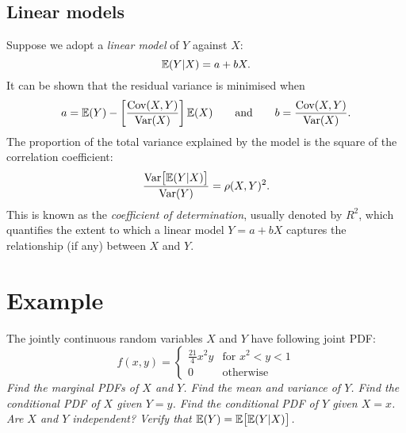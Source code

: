 \subsection{Linear models} 
Suppose we adopt a \emph{linear model} of $Y$ against $X$:
\[
\mathbb{E}(Y|X) = a + bX.
\]
It can be shown that the residual variance is minimised when
\[
a = \mathbb{E}(Y) - \left[\frac{\text{Cov}(X,Y)}{\text{Var}(X)}\right] \mathbb{E}(X)
\text{\qquad and\qquad} 
b = \frac{\text{Cov}(X,Y)}{\text{Var}(X)}.
\]
The proportion of the total variance explained by the model is the square of the correlation coefficient:
\[
\frac{\text{Var}\big[\mathbb{E}(Y|X)\big]}{\text{Var}(Y)} = \rho(X,Y)^2.
\]
This is known as the \emph{coefficient of determination}, usually denoted by $R^2$, which quantifies the extent to which a linear model $Y=a+bX$ captures the relationship (if any) between $X$ and $Y$.

\section{Example}
\begin{example}
The jointly continuous random variables $X$ and $Y$ have following joint PDF:
\[
f(x,y) = 
\begin{cases}
	\frac{21}{4}x^2y		& \text{for } x^2<y<1 \\
	0									& \text{otherwise}
\end{cases}
\]
\ben
\it Find the marginal PDFs of $X$ and $Y$.
\it Find the mean and variance of $Y$.
\it Find the conditional PDF of $X$ given $Y=y$.
\it Find the conditional PDF of $Y$ given $X=x$. 
\it Are $X$ and $Y$ independent? 
\it Verify that $\mathbb{E}(Y)=\mathbb{E}\big[\mathbb{E}(Y|X)\big]$.
\een
\end{example}


